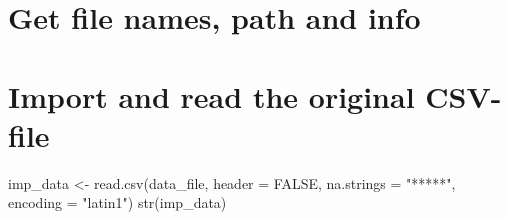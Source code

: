 \documentclass[
]{article}
\newenvironment{Shaded}{\begin{snugshade}}{\end{snugshade}}
\newcommand{\AttributeTok}[1]{\textcolor[rgb]{0.77,0.63,0.00}{#1}}
\newcommand{\ConstantTok}[1]{\textcolor[rgb]{0.00,0.00,0.00}{#1}}
\newcommand{\FunctionTok}[1]{\textcolor[rgb]{0.00,0.00,0.00}{#1}}
\newcommand{\NormalTok}[1]{#1}
\newcommand{\OtherTok}[1]{\textcolor[rgb]{0.56,0.35,0.01}{#1}}
\newcommand{\SpecialCharTok}[1]{\textcolor[rgb]{0.00,0.00,0.00}{#1}}
\newcommand{\StringTok}[1]{\textcolor[rgb]{0.31,0.60,0.02}{#1}}
\begin{document}
\hypertarget{get-file-names-path-and-info}{%
\section{Get file names, path and
info}\label{get-file-names-path-and-info}}

\begin{Shaded}
\end{Shaded}

\hypertarget{import-and-read-the-original-csv-file}{%
\section{Import and read the original
CSV-file}\label{import-and-read-the-original-csv-file}}

\begin{Shaded}
\begin{Highlighting}[]
\NormalTok{imp\_data }\OtherTok{\textless{}{-}} \FunctionTok{read.csv}\NormalTok{(data\_file, }\AttributeTok{header =} \ConstantTok{FALSE}\NormalTok{, }\AttributeTok{na.strings =} \StringTok{"*****"}\NormalTok{, }\AttributeTok{encoding =} \StringTok{"latin1"}\NormalTok{)}
\FunctionTok{str}\NormalTok{(imp\_data)}
\end{Highlighting}
\end{Shaded}
\end{document}
